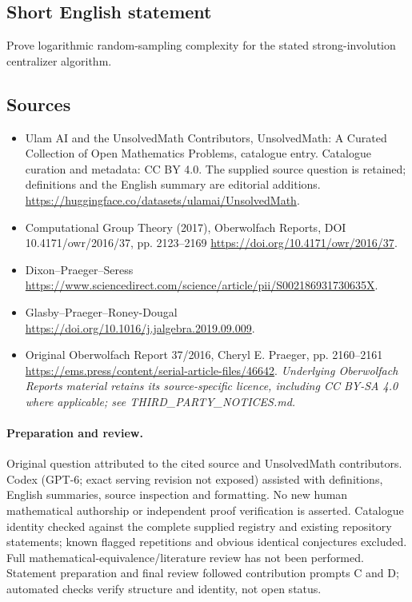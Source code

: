 \documentclass[11pt]{article}
\begin{document}
\subsection{Short English statement}
Prove logarithmic random-sampling complexity for the stated strong-involution centralizer algorithm.
\subsection{Sources}
\begin{itemize}
\item[\hypertarget{source:statement:1}{S1}] Ulam AI and the UnsolvedMath Contributors, UnsolvedMath: A Curated Collection of Open Mathematics Problems, catalogue entry. Catalogue curation and metadata: CC BY 4.0. The supplied source question is retained; definitions and the English summary are editorial additions.
\url{https://huggingface.co/datasets/ulamai/UnsolvedMath}.
\item[\hypertarget{source:statement:2}{S2}] Computational Group Theory (2017), Oberwolfach Reports, DOI 10.4171/owr/2016/37, pp. 2123--2169
\url{https://doi.org/10.4171/owr/2016/37}.
\item[\hypertarget{source:statement:3}{S3}] Dixon--Praeger--Seress
\url{https://www.sciencedirect.com/science/article/pii/S002186931730635X}.
\item[\hypertarget{source:statement:4}{S4}] Glasby--Praeger--Roney-Dougal
\url{https://doi.org/10.1016/j.jalgebra.2019.09.009}.
\item[\hypertarget{source:statement:5}{S5}] Original Oberwolfach Report 37/2016, Cheryl E. Praeger, pp. 2160--2161
\url{https://ems.press/content/serial-article-files/46642}.
\textit{Underlying Oberwolfach Reports material retains its source-specific licence, including CC BY-SA 4.0 where applicable; see THIRD\_PARTY\_NOTICES.md.}
\end{itemize}
\paragraph{Preparation and review.}
Original question attributed to the cited source and UnsolvedMath contributors. Codex (GPT-6; exact serving revision not exposed) assisted with definitions, English summaries, source inspection and formatting. No new human mathematical authorship or independent proof verification is asserted. Catalogue identity checked against the complete supplied registry and existing repository statements; known flagged repetitions and obvious identical conjectures excluded. Full mathematical-equivalence/literature review has not been performed. Statement preparation and final review followed contribution prompts C and D; automated checks verify structure and identity, not open status.
\label{end:statement}
\end{document}
